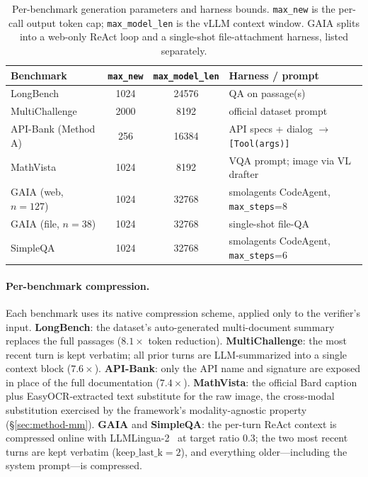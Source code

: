 \documentclass[11pt]{article}
\theoremstyle{plain}
\theoremstyle{definition}
\begin{document}
\begin{table}[h]
\centering
\footnotesize
\setlength{\tabcolsep}{6pt}
\begin{tabular}{l c c l}
\toprule
Benchmark & \texttt{max\_new} & \texttt{max\_model\_len} & Harness / prompt \\
\midrule
LongBench           & 1024 & 24576 & QA on passage(s) \\
MultiChallenge      & 2000 & 8192  & official dataset prompt \\
API-Bank (Method A) & 256  & 16384 & API specs + dialog $\to$ \texttt{[Tool(args)]} \\
MathVista           & 1024 & 8192  & VQA prompt; image via VL drafter \\
GAIA (web, $n{=}127$)  & 1024 & 32768 & smolagents CodeAgent, \texttt{max\_steps}=8 \\
GAIA (file, $n{=}38$)  & 1024 & 32768 & single-shot file-QA \\
SimpleQA            & 1024 & 32768 & smolagents CodeAgent, \texttt{max\_steps}=6 \\
\bottomrule
\end{tabular}
\caption{Per-benchmark generation parameters and harness bounds. \texttt{max\_new} is the per-call output token cap; \texttt{max\_model\_len} is the vLLM context window. GAIA splits into a web-only ReAct loop and a single-shot file-attachment harness, listed separately.}
\label{tab:gen_params}
\end{table}

\paragraph{Per-benchmark compression.}
Each benchmark uses its native compression scheme, applied only to the verifier's input. \textbf{LongBench}: the dataset's auto-generated multi-document summary replaces the full passages ($8.1\times$ token reduction). \textbf{MultiChallenge}: the most recent turn is kept verbatim; all prior turns are LLM-summarized into a single context block ($7.6\times$). \textbf{API-Bank}: only the API name and signature are exposed in place of the full documentation ($7.4\times$). \textbf{MathVista}: the official Bard caption plus EasyOCR-extracted text substitute for the raw image, the cross-modal substitution exercised by the framework's modality-agnostic property (\S\ref{sec:method-mm}). \textbf{GAIA} and \textbf{SimpleQA}: the per-turn ReAct context is compressed online with LLMLingua-2~\citep{llmlingua2024} at target ratio $0.3$; the two most recent turns are kept verbatim ($\text{keep\_last\_k}{=}2$), and everything older---including the system prompt---is compressed.
\end{document}
